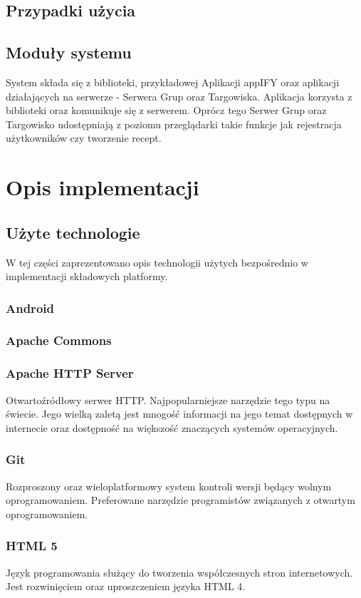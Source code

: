 \documentclass[11pt,a4paper,polish,thesis]{dcsbook}
\begin{document}
\section{Przypadki użycia}
\section{Moduły systemu}
System składa się z biblioteki, przykładowej Aplikacji appIFY oraz aplikacji działających na serwerze - Serwera Grup oraz Targowiska.
Aplikacja korzysta z biblioteki oraz komunikuje się z serwerem. Oprócz tego Serwer Grup oraz Targowisko udostępniają z poziomu przeglądarki takie funkcje jak rejestracja użytkowników czy tworzenie recept.

\chapter{Opis implementacji}
\section{Użyte technologie}
W tej części zaprezentowano opis technologii użytych bezpośrednio w implementacji składowych platformy.
\subsection{Android}
\subsection{Apache Commons}
\subsection{Apache HTTP Server}
Otwartoźródłowy serwer HTTP. Najpopularniejsze narzędzie tego typu na świecie. Jego wielką zaletą jest mnogość informacji na jego temat dostępnych w internecie oraz
dostępność na większość znaczących systemów operacyjnych.
\subsection{Git}
Rozproszony oraz wieloplatformowy system kontroli wersji będący wolnym oprogramowaniem. Preferowane narzędzie programistów związanych z otwartym oprogramowaniem.
\subsection{HTML 5}
Język programowania służący do tworzenia współczesnych stron internetowych. Jest rozwinięciem oraz uproszczeniem języka HTML 4.
\end{document}
